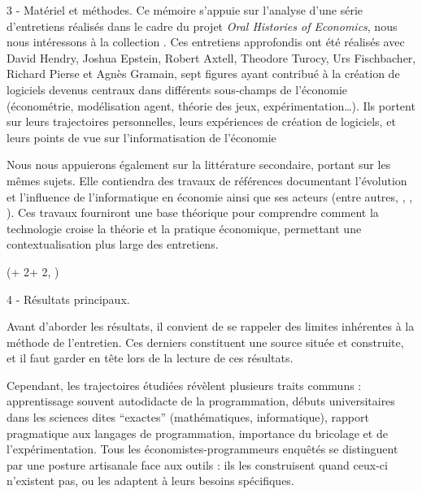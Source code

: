\documentclass{beamer}
\newlength{\blockOne}
\begin{document}
\begin{frame}[t]
\begin{textblock*}{\colwidth}
\begin{alertblock}{3 - Matériel et méthodes.}
	Ce mémoire s’appuie sur l'analyse d'une série d'entretiens réalisés dans le cadre du projet \textit{Oral Histories of Economics}, nous nous intéressons à la collection \cite{InterviewComputerizationEconomics}. Ces entretiens approfondis ont été réalisés avec David Hendry, Joshua Epstein, Robert Axtell, Theodore Turocy, Urs Fischbacher, Richard Pierse et Agnès Gramain, sept figures ayant contribué à la création de logiciels devenus centraux dans différents sous-champs de l’économie (économétrie, modélisation agent, théorie des jeux, expérimentation…). Ils portent sur leurs trajectoires personnelles, leurs expériences de création de logiciels, et leurs points de vue sur l'informatisation de l'économie 
	\vspace{0.5em}

	Nous nous appuierons également sur la littérature secondaire, portant sur les mêmes sujets. Elle contiendra des travaux de références documentant l’évolution et l’influence de l’informatique en économie ainsi que ses acteurs (entre autres, \cite{boumansComputerizationEconomicsThree2023}, \cite{cherrierWriteYourModel2023}, \cite{backhouseItsComputersStupid2017}).
	Ces travaux fourniront une base théorique pour comprendre comment la technologie croise la théorie et la pratique économique, permettant une contextualisation plus large des entretiens.
	
	\vspace{0.25cm}
	\end{alertblock}

\end{textblock*}





\begin{textblock*}{\colwidth}(\leftmargin + 2\colwidth + 2\colsep, \blockOne)

	\begin{alertblock}{4 - Résultats principaux.}
	\RaggedRight
	\vspace{0.25cm}

	Avant d’aborder les résultats, il convient de se rappeler des limites inhérentes à la méthode de l'entretien. Ces derniers constituent une source située et construite, et il faut garder en tête lors de la lecture de ces résultats.
	
	Cependant, les trajectoires étudiées révèlent plusieurs traits communs : apprentissage souvent autodidacte de la programmation, débuts universitaires dans les sciences dites “exactes” (mathématiques, informatique), rapport pragmatique aux langages de programmation, importance du bricolage et de l’expérimentation. Tous les économistes-programmeurs enquêtés se distinguent par une posture artisanale face aux outils : ils les construisent quand ceux-ci n’existent pas, ou les adaptent à leurs besoins spécifiques.


\end{alertblock}
\end{textblock*}
\end{frame}
\end{document}
